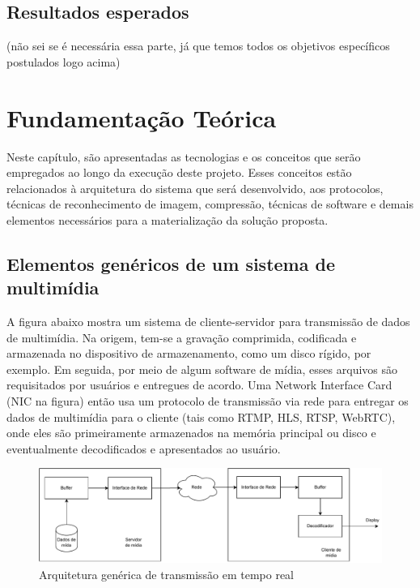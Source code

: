 \documentclass[12pt, %
openright, 
oneside, %
a4paper,    %
brazil]{facom-ufu-abntex2}
\begin{document}
\section{Resultados esperados}

 (não sei se é necessária essa parte, já que temos todos os objetivos específicos postulados logo acima)

\chapter{Fundamentação Teórica}

Neste capítulo, são apresentadas as tecnologias e os conceitos que serão
empregados ao longo da execução deste projeto. Esses conceitos estão
relacionados à arquitetura do sistema que será desenvolvido, aos protocolos,
técnicas de reconhecimento de imagem, compressão, técnicas de software e demais
elementos necessários para a materialização da solução proposta.

\section{Elementos genéricos de um sistema de multimídia}

A figura abaixo mostra um sistema de cliente-servidor para transmissão de dados
de multimídia. Na origem, tem-se a gravação comprimida, codificada e armazenada
no dispositivo de armazenamento, como um disco rígido, por exemplo. Em seguida,
por meio de algum software de mídia, esses arquivos são requisitados por
usuários e entregues de acordo. Uma Network Interface Card (NIC na figura)
então usa um protocolo de transmissão via rede para entregar os dados de
multimídia para o cliente (tais como RTMP, HLS, RTSP, WebRTC), onde eles são
primeiramente armazenados na memória principal ou disco e eventualmente
decodificados e apresentados ao usuário.

\begin{figure}[!ht]
	\centering
	\includegraphics[width=1\linewidth]{media_fundamentals.pdf}
	\caption[Representação de um arquitetura de tempo real genérica]{Arquitetura genérica de transmissão em tempo real}
	\label{fig:graficosVariandoTamanhoRede}
\end{figure}
\end{document}
